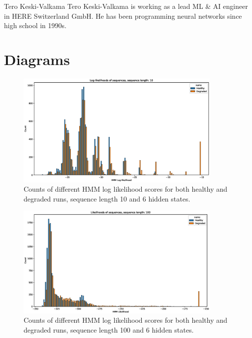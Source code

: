 \documentclass[journal]{IEEEtran}
\begin{document}



\begin{IEEEbiography}{Tero Keski-Valkama}
Tero Keski-Valkama is working as a lead ML \& AI engineer in HERE Switzerland GmbH. He has been programming neural networks since high school in 1990s.
\end{IEEEbiography}

\appendices

\section{Diagrams}

\begin{figure}[h]
 \centering
 \includegraphics[width=10cm,keepaspectratio=true]{./hmm_histograms_10.eps}
 \caption{Counts of different HMM log likelihood scores for both healthy and degraded runs, sequence length 10 and 6 hidden states.}
 \label{figure:log_likelihood_10}
\end{figure}

\begin{figure}[h]
 \centering
 \includegraphics[width=10cm,keepaspectratio=true]{./hmm_histograms_100.eps}
 \caption{Counts of different HMM log likelihood scores for both healthy and degraded runs, sequence length 100 and 6 hidden states.}
 \label{figure:log_likelihood_100}
\end{figure}
\end{document}
